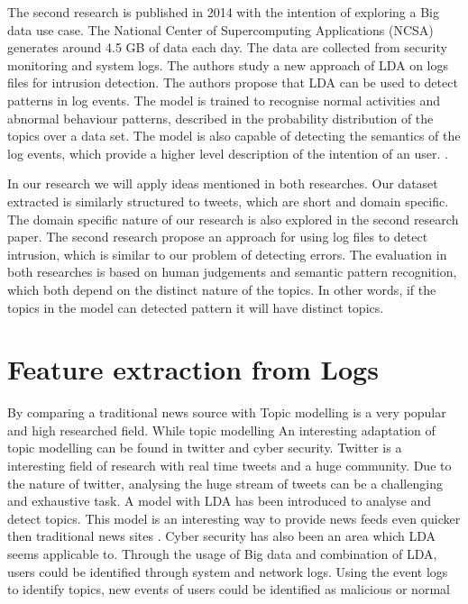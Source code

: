 The second research is published in 2014 with the intention of exploring a Big data use case. The National Center of Supercomputing Applications (NCSA) generates around 4.5 GB of data each day. The data are collected from security monitoring and system logs. The authors study a new approach of LDA on logs files for intrusion detection. The authors propose that LDA can be used to detect patterns in log events. The model is trained to recognise normal activities and abnormal behaviour patterns, described in the probability distribution of the topics over a data set. The model is also capable of detecting the semantics of the log events, which provide a higher level description of the intention of an user. \cite{Jingwei2014KnowledgeLDA}. 

In our research we will apply ideas mentioned in both researches. Our dataset extracted is similarly structured to tweets, which are short and domain specific. The domain specific nature of our research is also explored in the second research paper. The second research propose an approach for using log files to detect intrusion, which is similar to our problem of detecting errors. The evaluation in both researches is based on human judgements and semantic pattern recognition, which both depend on the distinct nature of the topics. In other words, if the topics in the model can detected pattern it will have distinct topics.

\section{Feature extraction from Logs} \label{theory:featureextraction}


\setlength{\parindent}{3ex} By comparing a traditional news source with
Topic modelling is a very popular and high researched field. While topic modelling  
An interesting adaptation of topic modelling can be found in twitter and cyber security. Twitter is a interesting field of research with real time tweets and a huge community. Due to the nature of twitter, analysing the huge stream of tweets can be a challenging and exhaustive task. A model with LDA has been introduced to analyse and detect topics. This model is an interesting way to provide news feeds even quicker then traditional news sites . Cyber security has also been an area which LDA seems applicable to. Through the usage of Big data and combination of LDA, users could be identified through system and network logs. Using the event logs to identify topics, new events of users could be identified as malicious or normal 


